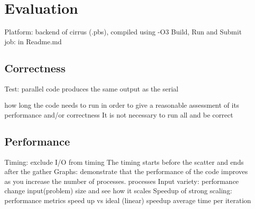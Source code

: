 \documentclass[12pt,a4paper]{article}
\newcommand{\sectionVspacing}{\vspace{15pt}}
\begin{document}
\sectionVspacing

\section{Evaluation}
Platform: backend of cirrus (.pbs), compiled using -O3
Build, Run and Submit job: in Readme.md

\subsection{Correctness}
Test: parallel code produces the same output as the serial

how long the code needs to run in order to give a reasonable assessment of its performance and/or correctness
It is not necessary to run all and be correct

\subsection{Performance}

Timing: exclude I/O from timing The timing starts before the scatter and ends after the gather
Graphs: demonstrate that the performance of the code improves as you increase the number of processes.
	 processes
	 Input variety: performance change input(problem) size and see how it scales
	 Speedup of strong scaling: performance metrics speed up vs ideal (linear) speedup 
	 average time per iteration

\sectionVspacing


\end{document}
